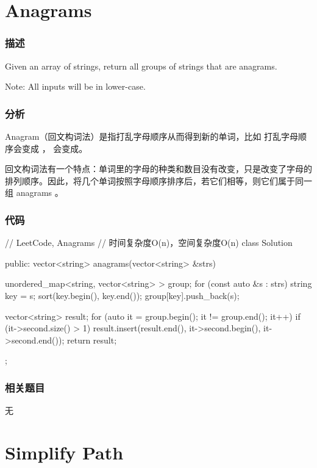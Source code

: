 \section{Anagrams} %
\label{sec:anagrams}


\subsubsection{描述}
Given an array of strings, return all groups of strings that are anagrams.

Note: All inputs will be in lower-case.


\subsubsection{分析}
Anagram（回文构词法）是指打乱字母顺序从而得到新的单词，比如  打乱字母顺序会变成  ， 会变成。

回文构词法有一个特点：单词里的字母的种类和数目没有改变，只是改变了字母的排列顺序。因此，将几个单词按照字母顺序排序后，若它们相等，则它们属于同一组 anagrams 。


\subsubsection{代码}
\begin{Code}
// LeetCode, Anagrams
// 时间复杂度O(n)，空间复杂度O(n)
class Solution {
public:
    vector<string> anagrams(vector<string> &strs) {
        unordered_map<string, vector<string> > group;
        for (const auto &s : strs) {
            string key = s;
            sort(key.begin(), key.end());
            group[key].push_back(s);
        }

        vector<string> result;
        for (auto it = group.begin(); it != group.end(); it++) {
            if (it->second.size() > 1)
                result.insert(result.end(), it->second.begin(), it->second.end());
        }
        return result;
    }
};
\end{Code}


\subsubsection{相关题目}
\begindot
\item 无
\myenddot


\section{Simplify Path} %
\label{sec:simplify-path}



